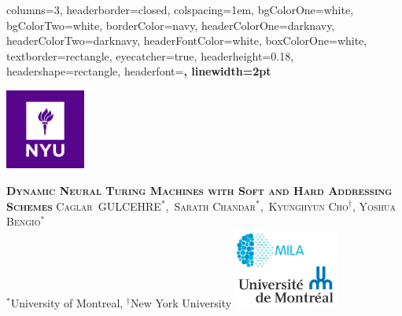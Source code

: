 \documentclass[landscape,a0paper,fontscale=0.285,final]{baposter} %
\begin{document}
\begin{poster}
{
columns=3,
headerborder=closed, %
colspacing=1em, %
bgColorOne=white, %
bgColorTwo=white, %
borderColor=navy, %
headerColorOne=darknavy, %
headerColorTwo=darknavy, %
headerFontColor=white, %
boxColorOne=white, %
textborder=rectangle, %
eyecatcher=true, %
headerheight=0.18\textheight, %
headershape=rectangle, %
headerfont=\Large\bf\textsc, %
linewidth=2pt %
}
%
{
\begin{minipage}[b]{0.0965\linewidth}
    \includegraphics[height=7.1em]{./nyu_logo.jpg}
\end{minipage}}
{ \fontsize{31pt}{2pt} \bf\textsc{Dynamic Neural Turing Machines with Soft and Hard Addressing
    Schemes}\vspace{0.175em}} %
{\textsc{Caglar~GULCEHRE$^\ast$,~Sarath Chandar$^\ast$,~Kyunghyun Cho$^\dagger$, Yoshua
    Bengio$^\ast$}
  \\ \vspace{0.5mm}
{ $^\ast$University of Montreal, $^\dagger$New York University} \vspace{-4mm}} %
{\includegraphics[height=7.1em]{./logo-MILA-white.jpg}} %



\end{poster}
\end{document}
